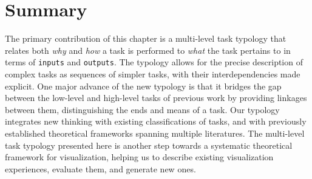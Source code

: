 
\section{Summary}
\label{typology:conclusion}


The primary contribution of this chapter is a multi-level task typology that relates both {\it why} and {\it how} a task is performed to {\it what} the task pertains to in terms of {\tt inputs} and {\tt outputs}.
The typology allows for the precise description of complex tasks as sequences of simpler tasks, with their interdependencies made explicit.
One major advance of the new typology is that it bridges the gap between the low-level and high-level tasks of previous work by providing linkages between them, distinguishing the ends and means of a task.
Our typology integrates new thinking with existing classifications of tasks, and with previously established theoretical frameworks spanning multiple literatures.
The multi-level task typology presented here is another step towards a systematic theoretical framework for visualization, helping us to describe existing visualization experiences, evaluate them, and generate new ones.

\endinput
